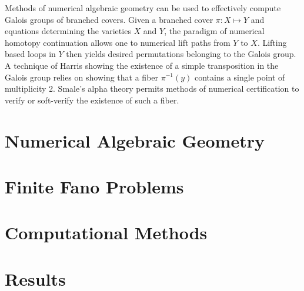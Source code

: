 \documentclass[12pt]{amsart}
\theoremstyle{definition}
\begin{document}
%
Methods of numerical algebraic geometry can be used to effectively compute Galois groups of branched covers. Given a branched cover $\pi:X\mapsto Y$ and equations determining the varieties $X$ and $Y$, the paradigm of numerical homotopy continuation allows one to numerical lift paths from $Y$ to $X$. Lifting based loops in $Y$ then yields desired permutations belonging to the Galois group. A technique of Harris showing the existence of a simple transposition in the Galois group relies on showing that a fiber $\pi^{-1}(y)$ contains a single point of multiplicity 2. Smale's alpha theory permits methods of numerical certification to verify or soft-verify the existence of such a fiber.



\section{Numerical Algebraic Geometry}
%




%




\section{Finite Fano Problems}
%

%

%



\section{Computational Methods}
%

%



\section{Results}




%

\end{document}
